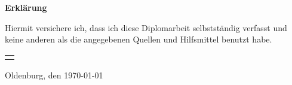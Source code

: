 \chapter*{}
\thispagestyle{empty}
\begin{center}
{\bfseries \Huge Erklärung}
\end{center}
\vspace{1.5cm}
Hiermit versichere ich, dass ich diese Diplomarbeit selbstständig verfasst und keine
anderen als die angegebenen Quellen und Hilfsmittel benutzt habe. \\[3cm]

\setlength{\parindent}{0cm}
\begin{tabular}{p{10cm}} \hline \\ \end{tabular}

Oldenburg, den \today

\vfill
